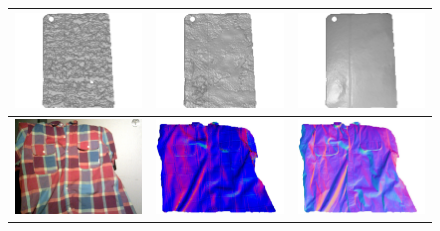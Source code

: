 \begin{figure}[!ht]
{\begin{tabular}{c|c c}
   \includegraphics[height = 0.23\linewidth]{figures/result/robust_padback_shape_init.pdf} 
   &
   \includegraphics[height = 0.23\linewidth]{figures/result/rgbd_padback_shape.pdf} &
   \includegraphics[height = 0.23\linewidth]{figures/result/robust_padback_shape.pdf}\\
\hline
   \includegraphics[height = 0.23\linewidth]{figures/result/robust_patternShirt_rgb.pdf} 
   &
   \includegraphics[height = 0.23\linewidth]{figures/result/rgbd_patternShirt_normal.pdf} &
   \includegraphics[height = 0.23\linewidth]{figures/result/robust_patternShirt_normal.pdf} \\


\end{tabular}}
\end{figure}
